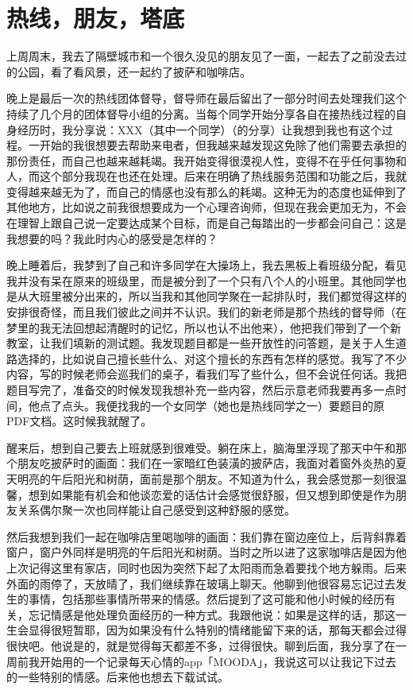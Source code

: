 \chapter{热线，朋友，塔底}


上周周末，我去了隔壁城市和一个很久没见的朋友见了一面，一起去了之前没去过的公园，看了看风景，还一起约了披萨和咖啡店。

晚上是最后一次的热线团体督导，督导师在最后留出了一部分时间去处理我们这个持续了几个月的团体督导小组的分离。当每个同学开始分享各自在接热线过程的自身经历时，我分享说：XXX（其中一个同学）（的分享）让我想到我也有这个过程。一开始的我很想要去帮助来电者，但我越来越发现这免除了他们需要去承担的那份责任，而自己也越来越耗竭。我开始变得很漠视人性，变得不在乎任何事物和人，而这个部分我现在也还在处理。后来在明确了热线服务范围和功能之后，我就变得越来越无为了，而自己的情感也没有那么的耗竭。这种无为的态度也延伸到了其他地方，比如说之前我很想要成为一个心理咨询师，但现在我会更加无为，不会在理智上跟自己说一定要达成某个目标，而是自己每踏出的一步都会问自己：这是我想要的吗？我此时内心的感受是怎样的？

晚上睡着后，我梦到了自己和许多同学在大操场上，我去黑板上看班级分配，看见我并没有呆在原来的班级里，而是被分到了一个只有八个人的小班里。其他同学也是从大班里被分出来的，所以当我和其他同学聚在一起排队时，我们都觉得这样的安排很奇怪，而且我们彼此之间并不认识。我们的新老师是那个热线的督导师（在梦里的我无法回想起清醒时的记忆，所以也认不出他来），他把我们带到了一个新教室，让我们填新的测试题。我发现题目都是一些开放性的问答题，是关于人生道路选择的，比如说自己擅长些什么、对这个擅长的东西有怎样的感觉。我写了不少内容，写的时候老师会巡我们的桌子，看我们写了些什么，但不会说任何话。我把题目写完了，准备交的时候发现我想补充一些内容，然后示意老师我要再多一点时间，他点了点头。我便找我的一个女同学（她也是热线同学之一）要题目的原PDF文档。这时候我就醒了。

醒来后，想到自己要去上班就感到很难受。躺在床上，脑海里浮现了那天中午和那个朋友吃披萨时的画面：我们在一家暗红色装潢的披萨店，我面对着窗外炎热的夏天\pozhehao{}明亮的午后阳光和树荫，面前是那个朋友。不知道为什么，我会感觉那一刻很温馨，想到如果能有机会和他谈恋爱的话估计会感觉很舒服，但又想到即使是作为朋友关系偶尔聚一次也同样能让自己感受到这种舒服的感觉。

然后我想到我们一起在咖啡店里喝咖啡的画面：我们靠在窗边座位上，后背斜靠着窗户，窗户外同样是明亮的午后阳光和树荫。当时之所以进了这家咖啡店是因为他上次记得这里有家店，同时也因为突然下起了太阳雨而急着要找个地方躲雨。后来外面的雨停了，天放晴了，我们继续靠在玻璃上聊天。他聊到他很容易忘记过去发生的事情，包括那些事情所带来的情感。然后提到了这可能和他小时候的经历有关，忘记情感是他处理负面经历的一种方式。我跟他说：如果是这样的话，那这一生会显得很短暂耶，因为如果没有什么特别的情绪能留下来的话，那每天都会过得很快吧。他说是的，就是觉得每天都差不多，过得很快。聊到后面，我分享了在一周前我开始用的一个记录每天心情的app「MOODA」，我说这可以让我记下过去的一些特别的情感。后来他也想去下载试试。

